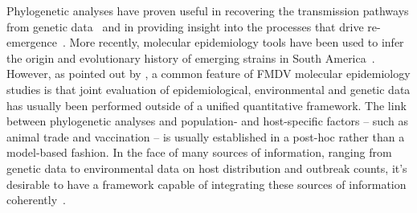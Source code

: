 \documentclass[10pt]{article}
\begin{document}
Phylogenetic analyses have proven useful in recovering the transmission pathways from genetic data~\citep{Cottam2008a, Cottam2008b} and in providing insight into the processes that drive re-emergence~\citep{DiNardo2011}.
More recently, molecular epidemiology tools have been used to infer the origin and evolutionary history of emerging strains in South America~\citep{Perez2001, Malirat2007, Malirat2011, Maradei2013}.
However, as pointed out by \citet{DiNardo2011}, a common feature of FMDV molecular epidemiology studies is that joint evaluation of epidemiological, environmental and genetic data has usually been performed outside of a unified quantitative framework.
The link between phylogenetic analyses and population- and host-specific factors -- such as animal trade and vaccination -- is usually established in a post-hoc rather than a model-based fashion.
In the face of many sources of information, ranging from genetic data to environmental data on host distribution and outbreak counts, it's desirable to have a framework capable of integrating these sources of information coherently~\citep{Lemey2014, Dudas2017}. %
\end{document}
